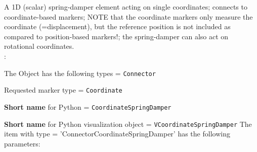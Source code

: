 
\label{sec:item:ObjectConnectorCoordinateSpringDamper}
A 1D (scalar) spring-damper element acting on single  coordinates; connects to coordinate-based markers; NOTE that the coordinate markers only measure the coordinate (=displacement), but the reference position is not included as compared to position-based markers!; the spring-damper can also act on rotational coordinates.
\vspace{12pt}\\

\noindent {}:
\bi
  \item The Object has the following types = \texttt{Connector}
  \item Requested marker type = \texttt{Coordinate}
  \item {\bf Short name} for Python = \texttt{CoordinateSpringDamper}
  \item {\bf Short name} for Python visualization object = \texttt{VCoordinateSpringDamper}
\ei\vspace{12pt} \noindent 
The item  with type = 'ConnectorCoordinateSpringDamper' has the following parameters:
\vspace{-0.5cm}\\
\vspace{-0.5cm}\\
